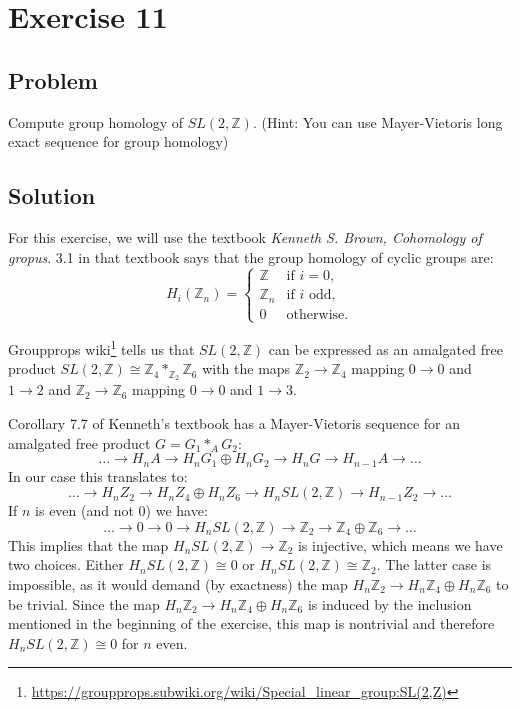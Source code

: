 \documentclass{article}
\begin{document}
\newpage
\section*{Exercise 11}
\subsection*{Problem}
Compute group homology of $SL(2,\mathbb{Z})$. (Hint: You can use Mayer-Vietoris long exact sequence for group homology)
\subsection*{Solution}
For this exercise, we will use the textbook \textit{Kenneth S. Brown, Cohomology of gropus}.
3.1 in that textbook says that the group homology of cyclic groups are:
\begin{equation*}
H_i(\mathbb{Z}_n) =
\begin{cases}
    \mathbb{Z} & \text{if } i = 0, \\
    \mathbb{Z}_n & \text{if } i \text{ odd}, \\
    0 & \text{otherwise}.
\end{cases}
\end{equation*}

Groupprops wiki\footnote{\url{https://groupprops.subwiki.org/wiki/Special_linear_group:SL(2,Z)}} tells us that $SL(2, \mathbb{Z})$ can be expressed
as an amalgated free product $SL(2, \mathbb{Z}) \cong \mathbb{Z}_4 *_{\mathbb{Z}_2} \mathbb{Z}_6$ with the maps
$\mathbb{Z}_2 \to \mathbb{Z}_4$ mapping $0 \to 0$ and $1 \to 2$ and $\mathbb{Z}_2 \to \mathbb{Z}_6$ mapping $0 \to 0$ and $1 \to 3$.



Corollary 7.7 of Kenneth's textbook has a Mayer-Vietoris sequence for an amalgated free product $G = G_1 *_A G_2$:
\begin{equation*}
\dots \to H_n A \to H_n G_1 \oplus H_n G_2 \to H_n G \to H_{n-1} A \to \dots
\end{equation*}
In our case this translates to:
\begin{equation*}
\dots \to H_n Z_2 \to H_n Z_4 \oplus H_n Z_6 \to H_n SL(2,\mathbb{Z}) \to H_{n-1} Z_2 \to \dots
\end{equation*}
If $n$ is even (and not $0$) we have:
\begin{equation*}
\dots \to 0 \to 0 \to H_n SL(2,\mathbb{Z}) \to \mathbb{Z}_2 \to \mathbb{Z}_4 \oplus \mathbb{Z}_6 \to \dots
\end{equation*}
This implies that the map $H_n SL(2,\mathbb{Z}) \to \mathbb{Z}_2$ is injective, which means we have two choices. Either $H_n SL(2,\mathbb{Z}) \cong 0$ or $H_n SL(2, \mathbb{Z}) \cong \mathbb{Z}_2$. The latter case is impossible, as it would demand (by exactness) the map $H_n \mathbb{Z}_2 \to H_n \mathbb{Z}_4 \oplus H_n \mathbb{Z}_6$ to be trivial. Since the map $H_n \mathbb{Z}_2 \to H_n \mathbb{Z}_4 \oplus H_n \mathbb{Z}_6$ is induced by the inclusion mentioned in the beginning of the exercise, this map is nontrivial and therefore $H_n SL(2,\mathbb{Z}) \cong 0$ for $n$ even.
\end{document}
